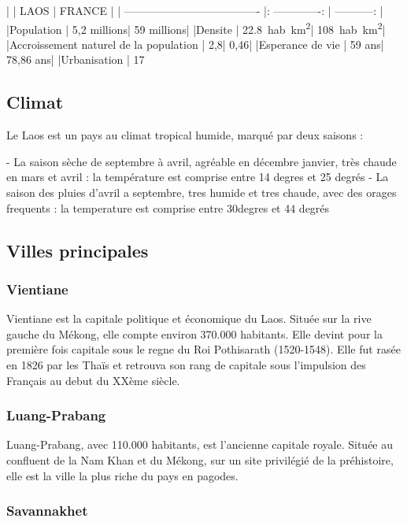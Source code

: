 \begin{multicols}{2}
|                                       |       LAOS      |    FRANCE    |
| ------------------------------------- |: -------------: | -----------: |
|Population                             |     5,2 millions|  	59 millions|
|Densite                                |     \SI{22,8}{hab.km^2}|   \SI{108}{hab.km^2}|
|Accroissement naturel de la population |              2,8|          0,46|
|Esperance de vie                       |           59 ans|     78,86 ans|
|Urbanisation                           |            17 %

\subsection{Climat}

Le Laos est un pays au climat tropical humide, marqué par deux saisons :

- La saison sèche de septembre à avril, agréable en décembre janvier, très chaude en mars et avril : la température est comprise entre 14 degres et 25 degrés
- La saison des pluies d’avril a septembre, tres humide et tres chaude, avec des orages frequents : la temperature est comprise entre 30degres et 44 degrés
\subsection{Villes principales}
\subsubsection{Vientiane}

Vientiane est la capitale politique et économique du Laos. Située sur la rive gauche du Mékong, elle compte environ 370.000 habitants. Elle devint pour la première fois capitale sous le regne du Roi Pothisarath (1520-1548). Elle fut rasée en 1826 par les Thaïs et retrouva son rang de capitale sous l’impulsion des Français au debut du XXème siècle.

\subsubsection{Luang-Prabang}

Luang-Prabang, avec 110.000 habitants, est l’ancienne capitale royale. Située au confluent de la Nam Khan et du Mékong, sur un site privilégié de la préhistoire, elle est la ville la plus riche du pays en pagodes.

\subsubsection{Savannakhet}


\end{multicols}
